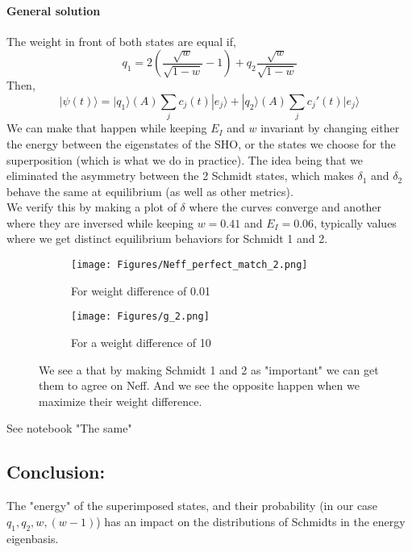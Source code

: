 \documentclass{article}
\begin{document}
\paragraph{General solution}
The weight in front of both states are equal if,
\begin{equation}
    q_1=2(\frac{\sqrt{w}}{\sqrt{1-w}}-1)+q_2\frac{\sqrt{w}}{\sqrt{1-w}}
\end{equation}
Then,
\begin{equation}
    |\psi(t)\rangle=|q_1\rangle(A)\sum_jc_j(t)|e_j\rangle+|q_2\rangle(A)\sum_jc_j'(t)|e_j\rangle
\end{equation}
We can make that happen while keeping $E_I$ and $w$ invariant by changing either the energy between the eigenstates of the SHO, or the states we choose for the superposition (which is what we do in practice). {\color{teal}The idea being that we eliminated the asymmetry between the 2 Schmidt states, which makes $\delta_{1}$ and $\delta_2$ behave the same at equilibrium (as well as other metrics).}\\

We verify this by making a plot of $\delta$ where the curves converge and another where they are inversed while keeping $w=0.41$ and $E_I=0.06$, typically values where we get distinct equilibrium behaviors for Schmidt 1 and 2.

\begin{figure}[h!]
  \centering
  \begin{subfigure}[b]{0.4\linewidth}
    \texttt{[image: Figures/Neff\_perfect\_match\_2.png]}
    \caption{For weight difference of 0.01}
    \label{fig:1}
  \end{subfigure}
  \begin{subfigure}[b]{0.4\linewidth}
    \texttt{[image: Figures/g\_2.png]}
    \caption{For a weight difference of 10}
    \label{fig:2}
  \end{subfigure}
  \caption{We see a that by making Schmidt 1 and 2 as "important" we can get them to agree on Neff. And we see the opposite happen when we maximize their weight difference.}
  \label{fig:gif_compare_weight}
\end{figure}

{\color{teal} See notebook "The same"}\\
\subsection{Conclusion:}
{\color{teal} The "energy" of the superimposed states, and their probability (in our case $q_1,q_2,w,(w-1)$) has an impact on the distributions of Schmidts in the energy eigenbasis.}
\end{document}
